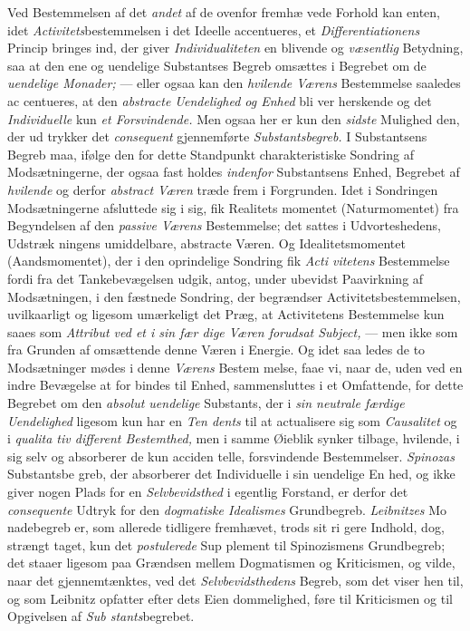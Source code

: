 Ved Bestemmelsen af det \emph{andet} af de ovenfor fremhæ\-%
vede Forhold kan enten, idet \emph{Activitets}bestemmelsen i det
Ideelle accentueres, et \emph{Differentiationens} Princip bringes
ind, der giver \emph{Individualiteten} en blivende og \emph{væsentlig}
Betydning, saa at den ene og uendelige Substantses Begreb
omsættes i Begrebet om de \emph{uendelige Monader;} --- eller
ogsaa kan den \emph{hvilende Værens} Bestemmelse saaledes ac\-%
centueres, at den \emph{abstracte Uendelighed og Enhed} bli\-%
ver herskende og det \emph{Individuelle} kun \emph{et Forsvindende.}
Men ogsaa her er kun den \emph{sidste} Mulighed den, der ud\-%
trykker det \emph{consequent} gjennemførte \emph{Substantsbegreb.} I
Substantsens Begreb maa, ifølge den for dette Standpunkt
charakteristiske Sondring af Modsætningerne, der ogsaa fast\-%
holdes \emph{indenfor} Substantsens Enhed, Begrebet af \emph{hvilende}
og derfor \emph{abstract Væren} træde frem i Forgrunden. Idet i
Sondringen Modsætningerne afsluttede sig i sig, fik Realitets\-%
momentet (Naturmomentet) fra Begyndelsen af den \emph{passive
Værens} Bestemmelse; det sattes i Udvorteshedens, Udstræk\-%
ningens umiddelbare, abstracte Væren. Og Idealitetsmomentet
(Aandsmomentet), der i den oprindelige Sondring fik \emph{Acti\-%
vitetens} Bestemmelse fordi fra det Tankebevægelsen udgik,
antog, under ubevidst Paavirkning af Modsætningen, i den
fæstnede Sondring, der begrændser Activitetsbestemmelsen,
uvilkaarligt og ligesom umærkeligt det Præg, at Activitetens
Bestemmelse kun saaes som \emph{Attribut ved et i sin fær\-%
dige Væren forudsat Subject,} --- men ikke som fra
Grunden af omsættende denne Væren i Energie. Og idet saa\-%
ledes de to Modsætninger mødes i denne \emph{Værens} Bestem\-%
melse, faae vi, naar de, uden ved en indre Bevægelse at for\-%
bindes til Enhed, sammensluttes i et Omfattende, for dette
Begrebet om den \emph{absolut uendelige} Substants, der i \emph{sin
neutrale færdige Uendelighed} ligesom kun har en \emph{Ten\-%
dents} til at actualisere sig som \emph{Causalitet} og i \emph{qualita\-%
tiv different Bestemthed,} men i samme Øieblik synker
tilbage, hvilende, i sig selv og absorberer de kun acciden\-%
telle, forsvindende Bestemmelser. \emph{Spinozas} Substantsbe\-%
greb, der absorberer det Individuelle i sin uendelige En\-%
hed, og ikke giver nogen Plads for en \emph{Selvbevidsthed} i
egentlig Forstand, er derfor det \emph{consequente} Udtryk for den
\emph{dogmatiske Idealismes} Grundbegreb. \emph{Leibnitzes} Mo\-%
nadebegreb er, som allerede tidligere fremhævet, trods sit ri\-%
gere Indhold, dog, strængt taget, kun det \emph{postulerede} Sup\-%
plement til Spinozismens Grundbegreb; det staaer ligesom paa
Grændsen mellem Dogmatismen og Kriticismen, og vilde, naar
det gjennemtænktes, ved det \emph{Selvbevidsthedens} Begreb,
som det viser hen til, og som Leibnitz opfatter efter dets Eien\-%
dommelighed, føre til Kriticismen og til Opgivelsen af \emph{Sub\-%
stants}begrebet.


